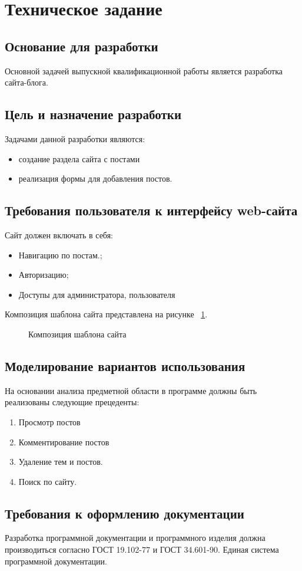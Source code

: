 \documentclass[a4paper]{article}
\begin{document}
\section{Техническое задание} 
\subsection{Основание для разработки}

Основной задачей выпускной квалификационной работы является разработка сайта-блога.

\subsection{Цель и назначение разработки}

Задачами данной разработки являются:
\begin{itemize}
\item создание раздела сайта с постами
\item реализация формы для добавления постов.
\end{itemize}

\subsection{Требования пользователя к интерфейсу web-сайта}

Сайт должен включать в себя:
\begin{itemize}
    \item Навигацию по постам.;
    \item Авторизацию;
    \item Доступы для администратора, пользователя
\end{itemize}

Композиция шаблона сайта представлена на рисунке ~\ref{templ:image}.

\begin{figure}[ht]

\caption{Композиция шаблона сайта}
\label{templ:image}
\end{figure}

\subsection{Моделирование вариантов использования}
На основании анализа предметной области в программе должны быть реализованы следующие прецеденты:
\begin{enumerate}
\item Просмотр постов
\item Комментирование постов
\item Удаление тем и постов.
\item Поиск по сайту.
\end{enumerate}

\subsection{Требования к оформлению документации}

Разработка программной документации и программного изделия должна производиться согласно ГОСТ 19.102-77 и ГОСТ 34.601-90. Единая система программной документации.
\end{document}
